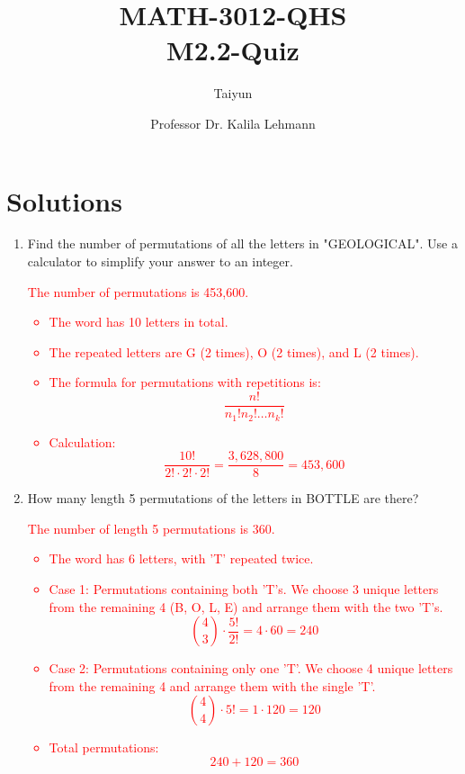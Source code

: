 \documentclass{article}
\author{Taiyun}
\title{MATH-3012-QHS \\ M2.2-Quiz}
\date{Professor Dr. Kalila Lehmann}
\begin{document}
\maketitle

\section*{Solutions}

\begin{enumerate}
    \item Find the number of permutations of all the letters in "GEOLOGICAL". Use a calculator to simplify your answer to an integer.
    \par
    \textcolor{red}{The number of permutations is 453,600.
    \begin{itemize}
        \item The word has 10 letters in total.
        \item The repeated letters are G (2 times), O (2 times), and L (2 times).
        \item The formula for permutations with repetitions is:
        \[
        \frac{n!}{n_1! n_2! \dots n_k!}
        \]
        \item Calculation:
        \[
        \frac{10!}{2! \cdot 2! \cdot 2!} = \frac{3,628,800}{8} = 453,600
        \]
    \end{itemize}}

    \item How many length 5 permutations of the letters in BOTTLE are there?
    \par
    \textcolor{red}{The number of length 5 permutations is 360.
    \begin{itemize}
        \item The word has 6 letters, with 'T' repeated twice.
        \item Case 1: Permutations containing both 'T's. We choose 3 unique letters from the remaining 4 (B, O, L, E) and arrange them with the two 'T's.
        \[
        \binom{4}{3} \cdot \frac{5!}{2!} = 4 \cdot 60 = 240
        \]
        \item Case 2: Permutations containing only one 'T'. We choose 4 unique letters from the remaining 4 and arrange them with the single 'T'.
        \[
        \binom{4}{4} \cdot 5! = 1 \cdot 120 = 120
        \]
        \item Total permutations:
        \[
        240 + 120 = 360
        \]
    \end{itemize}}


\end{enumerate}
\end{document}
